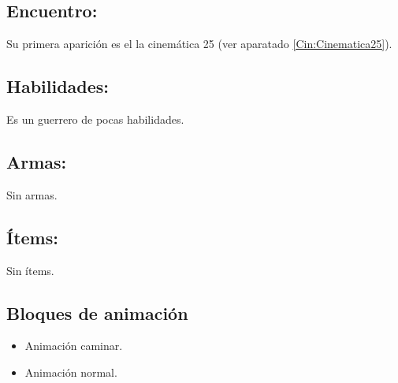 \subsection{Encuentro:}
Su primera aparición es el la cinemática 25 (ver aparatado \ref{Cin:Cinematica25}).
\subsection{Habilidades:}
Es un guerrero de pocas habilidades. 
\subsection{Armas:}
Sin armas.
\subsection{Ítems:}
Sin ítems.
\subsection{Bloques de animación}
\begin{itemize}
	\item Animación caminar.
	\item Animación normal.
\end{itemize}